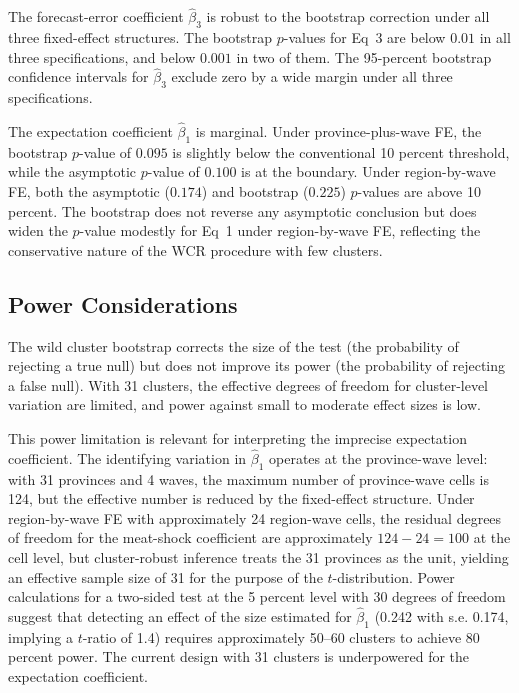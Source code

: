 The forecast-error coefficient $\hat{\beta}_3$ is robust to
the bootstrap correction under all three fixed-effect structures.
The bootstrap $p$-values for Eq~3 are below $0.01$ in all three
specifications, and below $0.001$ in two of them.
The 95-percent bootstrap confidence intervals for
$\hat{\beta}_3$ exclude zero by a wide margin under all three
specifications.

The expectation coefficient $\hat{\beta}_1$ is marginal.
Under province-plus-wave FE, the bootstrap $p$-value of
$0.095$ is slightly below the conventional 10 percent
threshold, while the asymptotic $p$-value of $0.100$ is at
the boundary.
Under region-by-wave FE, both the asymptotic ($0.174$) and
bootstrap ($0.225$) $p$-values are above 10 percent.
The bootstrap does not reverse any asymptotic conclusion but
does widen the $p$-value modestly for Eq~1 under
region-by-wave FE, reflecting the conservative nature of the
WCR procedure with few clusters.

\subsection{Power Considerations}\label{app:bootstrap_power}

The wild cluster bootstrap corrects the size of the test
(the probability of rejecting a true null) but does not
improve its power (the probability of rejecting a false null).
With 31 clusters, the effective degrees of freedom for
cluster-level variation are limited, and power against small
to moderate effect sizes is low.

This power limitation is relevant for interpreting the
imprecise expectation coefficient.
The identifying variation in $\hat{\beta}_1$ operates at the
province-wave level: with 31 provinces and 4 waves, the
maximum number of province-wave cells is 124, but the
effective number is reduced by the fixed-effect structure.
Under region-by-wave FE with approximately 24 region-wave
cells, the residual degrees of freedom for the meat-shock
coefficient are approximately $124 - 24 = 100$ at the
cell level, but cluster-robust inference treats the 31
provinces as the unit, yielding an effective sample size of
31 for the purpose of the $t$-distribution.
Power calculations for a two-sided test at the 5 percent
level with 30 degrees of freedom suggest that detecting an
effect of the size estimated for $\hat{\beta}_1$ (0.242
with s.e. 0.174, implying a $t$-ratio of 1.4) requires
approximately 50--60 clusters to achieve 80 percent power.
The current design with 31 clusters is underpowered for the
expectation coefficient.

